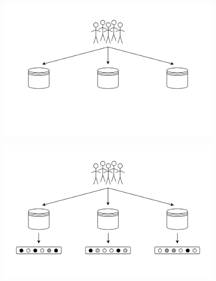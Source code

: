 \documentclass[hyperref={pdfpagelabels=false}]{beamer}
\begin{document}
    \begin{frame}
        \begin{figure}[b]
            \centering
            \includegraphics[scale=.26]{idee_reconstruction_collaborative2}
        \end{figure}
    \end{frame}

    \begin{frame}
        \begin{figure}[b]
            \centering
            \includegraphics[scale=.26]{idee_reconstruction_collaborative3}
        \end{figure}
    \end{frame}
\end{document}
